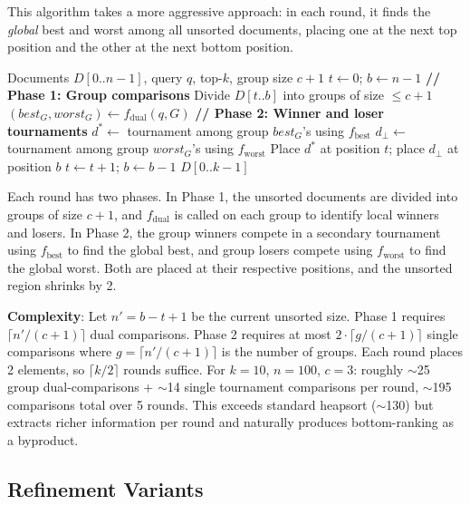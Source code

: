 This algorithm takes a more aggressive approach: in each round, it finds the \emph{global} best and worst among all unsorted documents, placing one at the next top position and the other at the next bottom position.

\begin{algorithm}[!htbp]
\caption{Double-Ended Selection Sort}
\label{alg:deselection}
\begin{algorithmic}[1]
\REQUIRE Documents $D[0..n{-}1]$, query $q$, top-$k$, group size $c{+}1$
\STATE $t \leftarrow 0$; $b \leftarrow n-1$
    \STATE \textbf{// Phase 1: Group comparisons}
    \STATE Divide $D[t..b]$ into groups of size $\leq c{+}1$
        \STATE $(best_G, worst_G) \leftarrow f_{\text{dual}}(q, G)$
    \ENDFOR
    \STATE \textbf{// Phase 2: Winner and loser tournaments}
    \STATE $d^* \leftarrow$ tournament among group $best_G$'s using $f_{\text{best}}$
    \STATE $d_\bot \leftarrow$ tournament among group $worst_G$'s using $f_{\text{worst}}$
    \STATE Place $d^*$ at position $t$; place $d_\bot$ at position $b$
    \STATE $t \leftarrow t + 1$; $b \leftarrow b - 1$
\ENDWHILE
\RETURN $D[0..k{-}1]$
\end{algorithmic}
\end{algorithm}

Each round has two phases. In Phase 1, the unsorted documents are divided into groups of size $c+1$, and $f_{\text{dual}}$ is called on each group to identify local winners and losers. In Phase 2, the group winners compete in a secondary tournament using $f_{\text{best}}$ to find the global best, and group losers compete using $f_{\text{worst}}$ to find the global worst. Both are placed at their respective positions, and the unsorted region shrinks by 2.

\textbf{Complexity}: Let $n' = b - t + 1$ be the current unsorted size. Phase 1 requires $\lceil n'/(c+1) \rceil$ dual comparisons. Phase 2 requires at most $2 \cdot \lceil g/(c+1) \rceil$ single comparisons where $g = \lceil n'/(c+1) \rceil$ is the number of groups. Each round places 2 elements, so $\lceil k/2 \rceil$ rounds suffice. For $k=10$, $n=100$, $c=3$: roughly $\sim$25 group dual-comparisons + $\sim$14 single tournament comparisons per round, $\sim$195 comparisons total over 5 rounds. This exceeds standard heapsort ($\sim$130) but extracts richer information per round and naturally produces bottom-ranking as a byproduct.


\subsection{Refinement Variants}
\label{sec:refinement}

